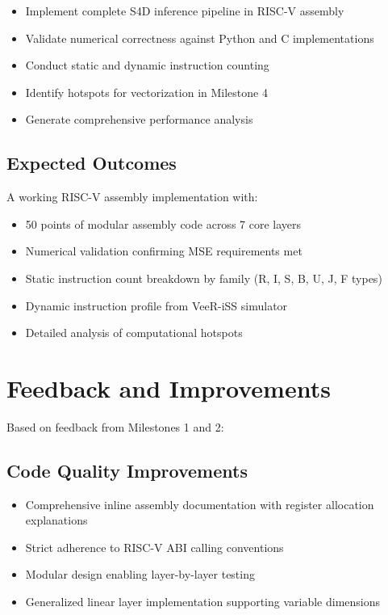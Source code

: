 \documentclass[conference]{IEEEtran}
\begin{document}
\begin{itemize}
    \item Implement complete S4D inference pipeline in RISC-V assembly
    \item Validate numerical correctness against Python and C implementations
    \item Conduct static and dynamic instruction counting
    \item Identify hotspots for vectorization in Milestone 4
    \item Generate comprehensive performance analysis
\end{itemize}

\subsection{Expected Outcomes}

A working RISC-V assembly implementation with:
\begin{itemize}
    \item 50 points of modular assembly code across 7 core layers
    \item Numerical validation confirming MSE requirements met
    \item Static instruction count breakdown by family (R, I, S, B, U, J, F types)
    \item Dynamic instruction profile from VeeR-iSS simulator
    \item Detailed analysis of computational hotspots
\end{itemize}

\section{Feedback and Improvements}

Based on feedback from Milestones 1 and 2:

\subsection{Code Quality Improvements}
\begin{itemize}
    \item Comprehensive inline assembly documentation with register allocation explanations
    \item Strict adherence to RISC-V ABI calling conventions
    \item Modular design enabling layer-by-layer testing
    \item Generalized linear layer implementation supporting variable dimensions
\end{itemize}
\end{document}
